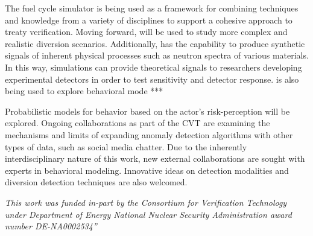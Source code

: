 The \Cyclus fuel cycle simulator is being used as a framework for combining techniques and knowledge from a variety of disciplines to support a cohesive approach to treaty verification.  Moving forward, \Cyclus will be used to study more complex and realistic diversion scenarios.  Additionally, \Cyclus has the capability to produce synthetic signals of inherent physical processes such as neutron spectra of various materials.  In this way, \Cyclus simulations can provide theoretical signals to researchers developing experimental detectors in order to test sensitivity and detector response.  \Cyclus is also being used to explore behavioral mode ***


Probabilistic models for behavior based on the actor's risk-perception will be explored.  Ongoing collaborations as part of the \gls{CVT} are examining the mechanisms and limits of expanding anomaly detection algorithms with other types of data, such as social media chatter.  Due to the inherently interdisciplinary nature of this work, new external collaborations are sought with experts in behavioral modeling. Innovative ideas on detection modalities and diversion detection techniques are also welcomed.



\textit{This work was funded in-part by the Consortium for Verification Technology under Department of Energy National Nuclear Security Administration award number DE-NA0002534”}
